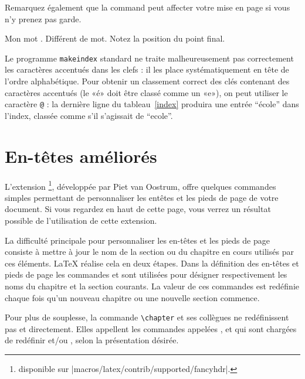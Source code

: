 Remarquez également que la command  peut affecter votre mise
en page si vous n'y prenez pas garde.

\begin{example}
Mon mot . Différent
de mot. Notez la
position du point final.
\end{example}

Le programme \texttt{makeindex} standard ne traite malheureusement pas
correctement les caractères accentués dans les clefs : il les place
systématiquement en tête de l'ordre alphabétique.
Pour obtenir un classement correct des clés contenant des caractères
accentués (le «é» doit être classé comme un «e»), on peut utiliser
le caractère \texttt{@} : la dernière ligne du tableau~\ref{index}
produira une entrée \enquote{école} dans l'index, classée comme s'il s'agissait
de \enquote{ecole}.


\section{En-têtes améliorés}
\label{sec:fancyhdr}

L'extension %
\footnote{disponible sur
          \CTAN|macros/latex/contrib/supported/fancyhdr|.},
développée par Piet van Oostrum, offre quelques commandes simples
permettant de personnaliser les entêtes et les pieds de page de votre
document. Si vous regardez en haut de cette page, vous verrez un
résultat possible de l'utilisation de cette extension.

La difficulté principale pour personnaliser les en-têtes et les pieds
de page consiste à mettre à jour le nom de la section ou du chapitre
en cours utilisés par ces éléments. \LaTeX{} réalise cela en deux
étapes. Dans la définition des en-têtes et pieds de page
les commandes  et  sont utilisées pour désigner
respectivement les noms du chapitre et la section courants.
La valeur de ces commandes est redéfinie chaque fois
qu'un nouveau chapitre ou une nouvelle section commence.

Pour plus de souplesse, la commande \verb|\chapter| et ses collègues
ne redéfinissent pas  et 
directement. Elles appellent les commandes appelées ,
 et  qui sont chargées de redéfinir
 et/ou , selon la présentation
désirée.

